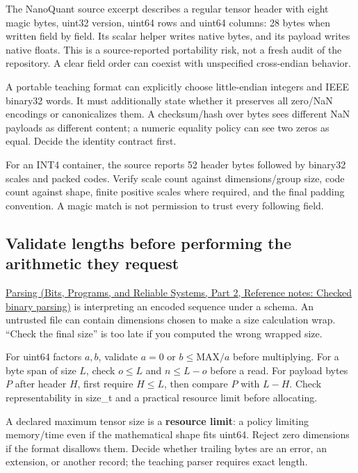 The NanoQuant source excerpt describes a regular tensor header with eight magic bytes, uint32 version, uint64 rows and uint64 columns: 28 bytes when written field by field. Its scalar helper writes native bytes, and its payload writes native floats. This is a source-reported portability risk, not a fresh audit of the repository. A clear field order can coexist with unspecified cross-endian behavior.

A portable teaching format can explicitly choose little-endian integers and IEEE binary32 words. It must additionally state whether it preserves all zero/NaN encodings or canonicalizes them. A checksum/hash over bytes sees different NaN payloads as different content; a numeric equality policy can see two zeros as equal. Decide the identity contract first.

For an INT4 container, the source reports 52 header bytes followed by binary32 scales and packed codes. Verify scale count against dimensions/group size, code count against shape, finite positive scales where required, and the final padding convention. A magic match is not permission to trust every following field.

\subsection{Validate lengths before performing the arithmetic they request}\label{05-engine-i-ch002-validate-lengths-before-performing-the-arithmetic-they-request}

\hypertarget{05-engine-i-ch002-validate-lengths-before-performing-the-arithmetic-they-request}{}

\href{../01-Bits-Programs-and-Reliable-Systems-P02/main.pdf\#nameddest=appendix-652d81568de9}{Parsing (Bits, Programs, and Reliable Systems, Part 2, Reference notes: Checked binary parsing)} is interpreting an encoded sequence under a schema. An untrusted file can contain dimensions chosen to make a size calculation wrap. ``Check the final size'' is too late if you computed the wrong wrapped size.

For uint64 factors \(a,b\), validate \(a=0\) or \(b\le\mathrm{MAX}/a\) before multiplying. For a byte span of size \(L\), check \(o\le L\) and \(n\le L-o\) before a read. For payload bytes \(P\) after header \(H\), first require \(H\le L\), then compare \(P\) with \(L-H\). Check representability in size\_t and a practical resource limit before allocating.

A declared maximum tensor size is a \textbf{resource limit}: a policy limiting memory/time even if the mathematical shape fits uint64. Reject zero dimensions if the format disallows them. Decide whether trailing bytes are an error, an extension, or another record; the teaching parser requires exact length.

